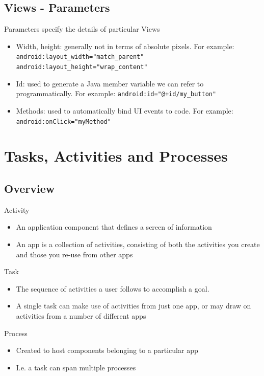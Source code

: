 \documentclass{article}
\begin{document}
\subsection{Views - Parameters}

Parameters specify the details of particular Views
\begin{itemize}
  \item Width, height: generally not in terms of absolute pixels. For example:\\ 
  \texttt{android:layout\_width="match\_parent"}\\
  \texttt{android:layout\_height="wrap\_content"}
  \item Id: used to generate a Java member variable we can refer to programmatically. For example: \texttt{android:id="@+id/my\_button"}
  \item Methods: used to automatically bind UI events to code. For example: \texttt{android:onClick="myMethod"}
\end{itemize}

\section{Tasks, Activities and Processes}

\subsection{Overview}

Activity
\begin{itemize}
  \item An application component that defines a screen of information
  \item An app is a collection of activities, consisting of both the activities you create and those you re-use from other apps 
\end{itemize}
Task
\begin{itemize}
  \item The sequence of activities a user follows to accomplish a goal.
  \item A single task can make use of activities from just one app, or may draw on activities from a number of different apps
\end{itemize}
Process
\begin{itemize}
  \item Created to host components belonging to a particular app
  \item I.e. a task can span multiple processes
\end{itemize}
\end{document}

